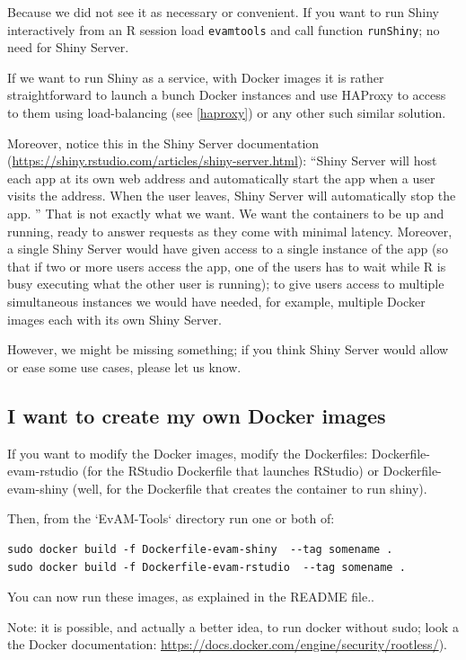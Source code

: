 \documentclass[a4paper,11pt]{article}
\begin{document}
Because we did not see it as necessary or convenient. If you want to run Shiny interactively from an R session load \texttt{evamtools} and call function \texttt{runShiny}; no need for Shiny Server.

If we want to run Shiny as a service, with Docker images it is rather straightforward to launch a bunch Docker instances and use HAProxy to access to them using load-balancing (see \ref{haproxy}) or any other such similar solution.

Moreover, notice this in the Shiny Server documentation (\url{https://shiny.rstudio.com/articles/shiny-server.html}): ``Shiny Server will host each app at its own web address and automatically start the app when a user visits the address. When the user leaves, Shiny Server will automatically stop the app. ''  That is not exactly what we want. We want the containers to be up and running, ready to answer requests as they come with minimal latency. Moreover, a single Shiny Server would have given access to a single instance of the app (so that if two or more users access the app, one of the users has to wait while R is busy executing what the other user is running); to give users access to multiple simultaneous instances we would have needed, for example, multiple Docker images each with its own Shiny Server.

However, we might be missing something; if you think Shiny Server would allow or ease some use cases, please let us know.


\subsection{I want to create my own Docker images}

If you want to modify the Docker images, modify the Dockerfiles: Dockerfile-evam-rstudio (for the RStudio Dockerfile that launches RStudio) or Dockerfile-evam-shiny (well, for the Dockerfile that creates the container to run shiny). 


Then, from the `EvAM-Tools` directory run one or both of:

\begin{verbatim}
sudo docker build -f Dockerfile-evam-shiny  --tag somename .
sudo docker build -f Dockerfile-evam-rstudio  --tag somename .
\end{verbatim}


You can now run these images, as explained in the README file..

Note: it is possible, and actually a better idea, to run docker without sudo; look a the Docker documentation:
\url{https://docs.docker.com/engine/security/rootless/}).
\end{document}

